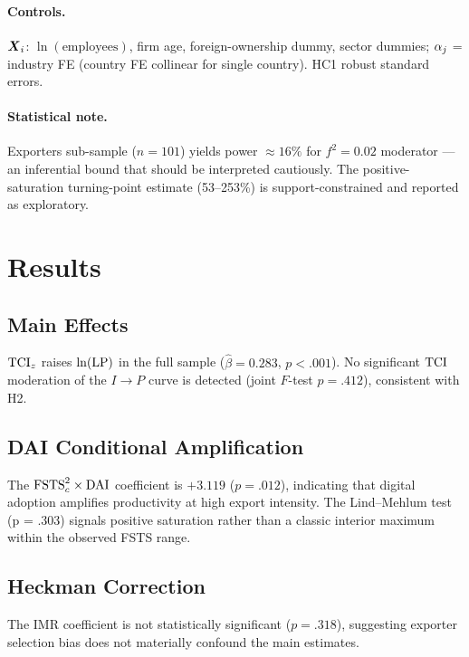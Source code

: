 \documentclass[smallextended]{svjour3}   %
\begin{document}
\paragraph{Controls.}
\(\boldsymbol{X}_{i}\): \(\ln(\text{employees})\), firm age, foreign-ownership dummy,
sector dummies; \({\alpha_{j}}\) = industry FE (country FE collinear for single
country).  HC1 robust standard errors.

\paragraph{Statistical note.}
Exporters sub-sample (\(n = 101\)) yields power \(\approx 16\%\) for
\(f^{2} = 0.02\) moderator --- an inferential bound that should be interpreted
cautiously.  The positive-saturation turning-point estimate (53--253\%) is
support-constrained and reported as exploratory.

\section{Results}
\label{sec:results}

\subsection{Main Effects}

\({\mathrm{TCI}_{z}}\) raises \({\ln(\mathrm{LP})}\) in the full sample (\(\hat{\beta} = 0.283\),
\(p < .001\)).  No significant \({\mathrm{TCI}}\) moderation of the \(I \to P\) curve
is detected (joint \(F\)-test \(p = .412\)), consistent with H2.

\subsection{DAI Conditional Amplification}

The \({\mathrm{FSTS}_{c}^{2}} \times {\mathrm{DAI}}\) coefficient is \(+3.119\) (\(p = .012\)),
indicating that digital adoption amplifies productivity at high export intensity.
The Lind--Mehlum test (p = .303) signals positive saturation rather than a
classic interior maximum within the observed FSTS range.

\subsection{Heckman Correction}

The IMR coefficient is not statistically significant (\(p = .318\)),
suggesting exporter selection bias does not materially confound the main
estimates.
\end{document}
